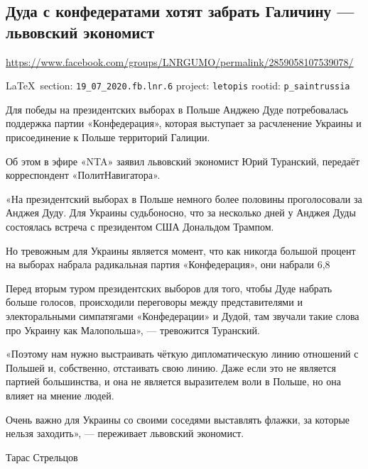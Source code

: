  
 
\subsection{Дуда с конфедератами хотят забрать Галичину --- львовский экономист}
\url{https://www.facebook.com/groups/LNRGUMO/permalink/2859058107539078/}
  
\vspace{0.5cm}
{\small\LaTeX~section: \verb|19_07_2020.fb.lnr.6| project: \verb|letopis| rootid: \verb|p_saintrussia|}
\vspace{0.5cm}
 
Для победы на президентских выборах в Польше Анджею Дуде потребовалась
поддержка партии «Конфедерация», которая выступает за расчленение Украины и
присоединение к Польше территорий Галиции.

Об этом в эфире «NTA» заявил львовский экономист Юрий Туранский, передаёт
корреспондент «ПолитНавигатора».

«На президентский выборах в Польше немного более половины проголосовали за
Анджея Дуду. Для Украины судьбоносно, что за несколько дней у Анджея Дуды
состоялась встреча с президентом США Дональдом Трампом.

Но тревожным для Украины является момент, что как никогда большой процент на
выборах набрала радикальная партия «Конфедерация», они набрали 6,8%

Перед вторым туром президентских выборов для того, чтобы Дуде набрать больше
голосов, происходили переговоры между представителями и электоральными
симпатягами «Конфедерации» и Дудой, там звучали такие слова про Украину как
Малопольша», --- тревожится Туранский.

«Поэтому нам нужно выстраивать чёткую дипломатическую линию отношений с Польшей
и, собственно, отстаивать свою линию. Даже если это не является партией
большинства, и она не является выразителем воли в Польше, но она влияет на
мнение людей.

Очень важно для Украины со своими соседями выставлять флажки, за которые нельзя
заходить», --- переживает львовский экономист.

Тарас Стрельцов 

